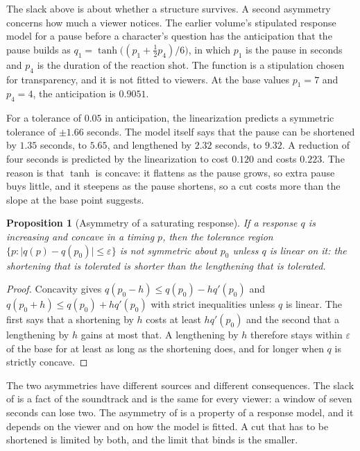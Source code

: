 \documentclass[11pt,twoside,openright]{book}
\theoremstyle{plain}
\newtheorem{proposition}[theorem]{Proposition}
\theoremstyle{definition}
\theoremstyle{remark}
\begin{document}
The slack above is about whether a structure survives. A second asymmetry concerns how much a viewer notices. The earlier volume's stipulated response model for a pause before a character's question has the anticipation that the pause builds as $q_1=\tanh\bigl((p_1+\tfrac12p_4)/6\bigr)$, in which $p_1$ is the pause in seconds and $p_4$ is the duration of the reaction shot. The function is a stipulation chosen for transparency, and it is not fitted to viewers. At the base values $p_1=7$ and $p_4=4$, the anticipation is $0.9051$.

For a tolerance of $0.05$ in anticipation, the linearization predicts a symmetric tolerance of $\pm1.66$ seconds. The model itself says that the pause can be shortened by $1.35$ seconds, to $5.65$, and lengthened by $2.32$ seconds, to $9.32$. A reduction of four seconds is predicted by the linearization to cost $0.120$ and costs $0.223$. The reason is that $\tanh$ is concave: it flattens as the pause grows, so extra pause buys little, and it steepens as the pause shortens, so a cut costs more than the slope at the base point suggests.

\begin{proposition}[Asymmetry of a saturating response]\label{prop:asym}
If a response $q$ is increasing and concave in a timing $p$, then the tolerance region $\{p:\lvert q(p)-q(p_0)\rvert\le\varepsilon\}$ is not symmetric about $p_0$ unless $q$ is linear on it: the shortening that is tolerated is shorter than the lengthening that is tolerated.
\end{proposition}

\begin{proof}
Concavity gives $q(p_0-h)\le q(p_0)-hq'(p_0)$ and $q(p_0+h)\le q(p_0)+hq'(p_0)$ with strict inequalities unless $q$ is linear. The first says that a shortening by $h$ costs at least $hq'(p_0)$ and the second that a lengthening by $h$ gains at most that. A lengthening by $h$ therefore stays within $\varepsilon$ of the base for at least as long as the shortening does, and for longer when $q$ is strictly concave.
\end{proof}

The two asymmetries have different sources and different consequences. The slack of  is a fact of the soundtrack and is the same for every viewer: a window of seven seconds can lose two. The asymmetry of  is a property of a response model, and it depends on the viewer and on how the model is fitted. A cut that has to be shortened is limited by both, and the limit that binds is the smaller.
\end{document}
